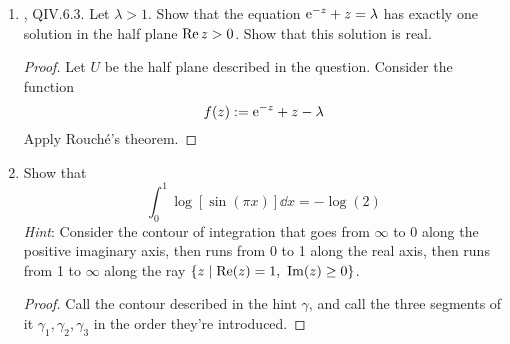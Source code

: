 \documentclass[../psets.tex]{subfiles}
\begin{document}
\begin{enumerate}[label={\textbf{\arabic*.}}]
\begin{enumerate}
\begin{proof}
            \begin{equation*}
                \frac{1}{2\pi i}\int_{\partial\D}\frac{i}{az^2-(a^2+1)z+a}\dd{z} = \res_{z_i}\left( \frac{i}{a(z-a)(z-a^{-1})} \right)
            \end{equation*}
            We now divide into two cases: $|a|<1$ and $|a|>1$. If $|a|<1$, then we evaluate the following using the heuristic from class on 5/2 about shrinking the loop around the singularity so that the multiplied terms approach being constant.
            \begin{equation*}
                \res_{z_1}\left( \frac{i}{a(z-a)(z-a^{-1})} \right) = \frac{i}{a(a-a^{-1})}
            \end{equation*}
            Similarly, if $|a|>1$, then we evaluate
            \begin{equation*}
                \res_{z_2}\left( \frac{i}{a(z-a)(z-a^{-1})} \right) = \frac{i}{a(a^{-1}-a)}
            \end{equation*}
            Therefore, the desired integral equals
            \begin{equation*}
                \boxed{\pm\frac{2\pi}{a(a-a^{-1})}}
            \end{equation*}
        \end{proof}
    \end{enumerate}
    \item \textcite{bib:FischerLieb}, QIV.6.3. Let $\lambda>1$. Show that the equation $\e[-z]+z=\lambda$ has exactly one solution in the half plane $\re z>0$. Show that this solution is real.
    \begin{proof}
        Let $U$ be the half plane described in the question. Consider the function
        \begin{equation*}
            f(z) := \e[-z]+z-\lambda
        \end{equation*}
        Apply Rouch\'{e}'s theorem.
    \end{proof}
    \item Show that
    \begin{equation*}
        \int_0^1\log[\sin(\pi x)]\dd{x} = -\log(2)
    \end{equation*}
    \emph{Hint}: Consider the contour of integration that goes from $\infty$ to 0 along the positive imaginary axis, then runs from 0 to 1 along the real axis, then runs from 1 to $\infty$ along the ray $\{z\mid\re(z)=1,\ \im(z)\geq 0\}$.
    \begin{proof}
        Call the contour described in the hint $\gamma$, and call the three segments of it $\gamma_1,\gamma_2,\gamma_3$ in the order they're introduced.


\end{proof}
\end{enumerate}
\end{document}
